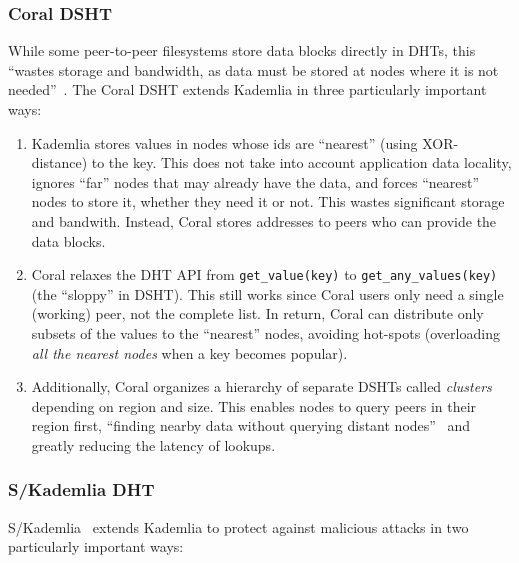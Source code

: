 \documentclass{sig-alternate}
\begin{document}
\subsubsection{Coral DSHT}

While some peer-to-peer filesystems store data blocks directly in DHTs,
this ``wastes storage and bandwidth, as data must be stored at nodes where it
is not needed''~\cite{freedman04}. The Coral DSHT extends Kademlia in three
particularly important ways:

\begin{enumerate}

  \item Kademlia stores values in nodes whose ids are ``nearest'' (using
        XOR-distance) to the key. This does not take into account application
        data locality, ignores ``far'' nodes that may already have the data,
        and forces ``nearest'' nodes to store it, whether they need it or not.
        This wastes significant storage and bandwith. Instead, Coral stores
        addresses to peers who can provide the data blocks.

  \item Coral relaxes the DHT API from \texttt{get\_value(key)} to
        \texttt{get\_any\_values(key)} (the ``sloppy'' in DSHT).
        This still works since Coral users only need a single (working) peer,
        not the complete list. In return, Coral can distribute only subsets of
        the values to the ``nearest'' nodes, avoiding hot-spots (overloading
        \textit{all the nearest nodes} when a key becomes popular).

  \item Additionally, Coral organizes a hierarchy of separate DSHTs called
        \textit{clusters} depending on region and size. This enables nodes to
        query peers in their region first, ``finding nearby data without
        querying distant nodes''~\cite{freedman04} and greatly reducing the latency
        of lookups.

\end{enumerate}

\subsubsection{S/Kademlia DHT}

S/Kademlia~\cite{baumgart07} extends Kademlia to protect against malicious attacks in two particularly important ways:
\end{document}
